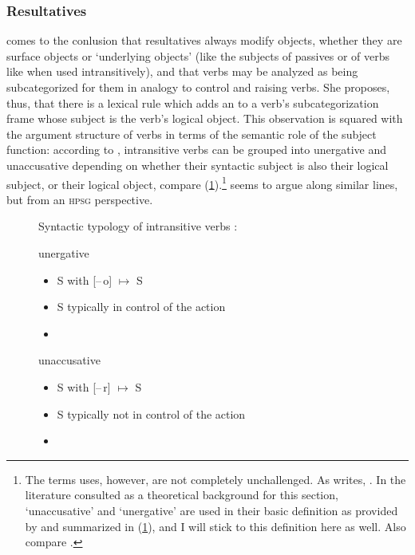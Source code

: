 \subsubsection{Resultatives}
\label{subsubsec:res}

\citet{simpson1983} comes to the conlusion that resultatives always modify
objects, whether they are surface objects or `underlying objects' (like the
subjects of passives or of verbs like  when used intransitively),
and that verbs may be analyzed as being subcategorized for them in analogy to
control and raising verbs. She proposes, thus, that there is a lexical rule
which adds an \XCompl{} to a verb's subcategorization frame whose subject is
the verb's logical object. This observation is squared with the argument
structure of verbs in terms of the semantic role of the subject function:
according to \citet{perlmutter1978}, intransitive verbs can be grouped into
unergative and unaccusative depending on whether their syntactic subject is
also their logical subject, or their logical object, compare
(\ref{ex:verbtyp}).\footnote{The terms \citet{perlmutter1978} uses, however,
are not completely unchallenged. As \citet{dixon2010b} writes,
. In the literature consulted as a theoretical background for this
section, `unaccusative' and `unergative' are used in their basic definition as
provided by \citet{perlmutter1978} and summarized in (\ref{ex:verbtyp}), and I
will stick to this definition here as well. Also compare
\citet[334--336]{bresnan2016}.} \citet{mueller2002} seems to argue along
similar lines, but from an \textsc{hpsg} perspective.

\begin{figure}
\pex\label{ex:verbtyp}%
Syntactic typology of intransitive verbs
\parencites{perlmutter1978}{bresnan2016}:
\a \begin{minipage}[t]{\remaining}
	unergative
	\begin{itemize}[leftmargin=*]
		\item S with [–\,o] $\mapsto$ S
		\item S typically in control of the action
		\item {}
	\end{itemize}
	\end{minipage}

\a \begin{minipage}[t]{\remaining}
	unaccusative
	\begin{itemize}[leftmargin=*]
		\item S with [–\,r] $\mapsto$ S
		\item S typically not in control of the action
		\item {}
	\end{itemize}
	\end{minipage}
\xe
\end{figure}

